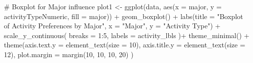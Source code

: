 \documentclass[
  letterpaper,
  DIV=11,
  numbers=noendperiod]{scrartcl}
\newenvironment{Shaded}{\begin{snugshade}}{\end{snugshade}}
\newcommand{\AttributeTok}[1]{\textcolor[rgb]{0.40,0.45,0.13}{#1}}
\newcommand{\CommentTok}[1]{\textcolor[rgb]{0.37,0.37,0.37}{#1}}
\newcommand{\DecValTok}[1]{\textcolor[rgb]{0.68,0.00,0.00}{#1}}
\newcommand{\FunctionTok}[1]{\textcolor[rgb]{0.28,0.35,0.67}{#1}}
\newcommand{\NormalTok}[1]{\textcolor[rgb]{0.00,0.23,0.31}{#1}}
\newcommand{\OtherTok}[1]{\textcolor[rgb]{0.00,0.23,0.31}{#1}}
\newcommand{\SpecialCharTok}[1]{\textcolor[rgb]{0.37,0.37,0.37}{#1}}
\newcommand{\StringTok}[1]{\textcolor[rgb]{0.13,0.47,0.30}{#1}}
\begin{document}
\begin{Shaded}
\begin{Highlighting}[]
\CommentTok{\# Boxplot for Major influence}
\NormalTok{plot1 }\OtherTok{\textless{}{-}} \FunctionTok{ggplot}\NormalTok{(data, }\FunctionTok{aes}\NormalTok{(}\AttributeTok{x =}\NormalTok{ major, }\AttributeTok{y =}\NormalTok{ activityTypeNumeric, }\AttributeTok{fill =}\NormalTok{ major)) }\SpecialCharTok{+}
  \FunctionTok{geom\_boxplot}\NormalTok{() }\SpecialCharTok{+}
  \FunctionTok{labs}\NormalTok{(}\AttributeTok{title =} \StringTok{"Boxplot of Activity Preferences by Major"}\NormalTok{,}
       \AttributeTok{x =} \StringTok{"Major"}\NormalTok{,}
       \AttributeTok{y =} \StringTok{"Activity Type"}\NormalTok{) }\SpecialCharTok{+}
  \FunctionTok{scale\_y\_continuous}\NormalTok{(}
    \AttributeTok{breaks =} \DecValTok{1}\SpecialCharTok{:}\DecValTok{5}\NormalTok{,}
    \AttributeTok{labels =}\NormalTok{ activity\_lbls}
\NormalTok{  )}\SpecialCharTok{+}
  \FunctionTok{theme\_minimal}\NormalTok{() }\SpecialCharTok{+} 
  \FunctionTok{theme}\NormalTok{(}\AttributeTok{axis.text.y =} \FunctionTok{element\_text}\NormalTok{(}\AttributeTok{size =} \DecValTok{10}\NormalTok{),}
    \AttributeTok{axis.title.y =} \FunctionTok{element\_text}\NormalTok{(}\AttributeTok{size =} \DecValTok{12}\NormalTok{), }
    \AttributeTok{plot.margin =} \FunctionTok{margin}\NormalTok{(}\DecValTok{10}\NormalTok{, }\DecValTok{10}\NormalTok{, }\DecValTok{10}\NormalTok{, }\DecValTok{20}\NormalTok{)}
\NormalTok{  )}


\end{Highlighting}
\end{Shaded}
\end{document}

